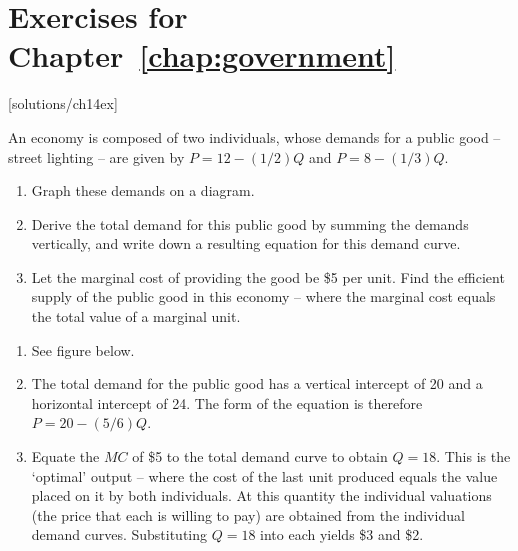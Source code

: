 \newpage
\section*{Exercises for Chapter~\ref{chap:government}}

\begin{enumialphparenastyle}

[solutions/ch14ex]

\begin{ex}\label{ex:ch14ex1}
An economy is composed of two individuals, whose demands for a public good -- street lighting -- are given by $P=12-(1/2)Q$ and $P=8-(1/3)Q$.
\begin{enumerate}
	\item	Graph these demands on a diagram.
	\item	Derive the total demand for this public good by summing the demands vertically, and write down a resulting equation for this demand curve.
	\item	Let the marginal cost of providing the good be \$5 per unit. Find the efficient supply of the public good in this economy -- where the marginal cost equals the total value of a marginal unit.
\end{enumerate}
\begin{sol}
\begin{enumerate}
	\item	See figure below.
	\item	The total demand for the public good has a vertical intercept of 20 and a horizontal intercept of 24. The form of the equation is therefore $P=20-(5/6)Q$.
	\item	Equate the $MC$ of \$5 to the total demand curve to obtain $Q=18$. This is the `optimal' output -- where the cost of the last unit produced equals the value placed on it by both individuals. At this quantity the individual valuations (the price that each is willing to pay) are obtained from the individual demand curves. Substituting $Q=18$ into each yields \$3 and \$2.
\end{enumerate}
\begin{center}
\end{center}
\end{sol}
\end{ex}
\end{enumialphparenastyle}
